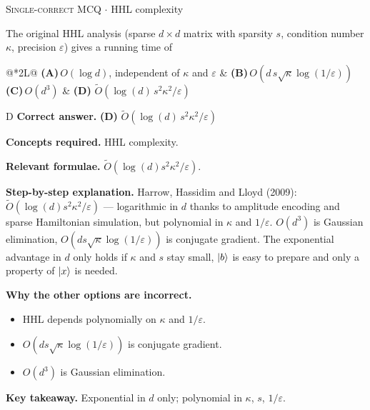 \documentclass[11pt,a4paper]{article}
\newcommand{\optlabel}[1]{\textbf{(#1)}}
\newcommand{\correctlabel}[1]{\textcolor{okgreen}{\textbf{(#1)}\,\ding{51}}}
\newenvironment{qitem}[1]{\begin{list}{}{\setlength{\leftmargin}{3.3em}\setlength{\labelwidth}{3.1em}%
  \setlength{\labelsep}{0.2em}\setlength{\topsep}{3pt}\setlength{\parsep}{3pt}}\item[\textbf{Q.#1}\hfill]}{\end{list}}
\newcommand{\qsep}{\par\vspace{2pt}{\color{black!15}\hrule}\vspace{4pt}}
\newcommand{\qmeta}[2]{{\footnotesize\color{black!60}\textsc{#1} \;$\cdot$\; #2}\par}
\begin{document}
\begin{qitem}{61}
\qmeta{Single-correct MCQ}{HHL complexity}
The original HHL analysis (sparse $d\times d$ matrix with sparsity $s$, condition number $\kappa$, precision $\varepsilon$) gives a running time of
\par\smallskip\noindent\begin{tabularx}{\linewidth}{@{}*{2}{L}@{}}
\optlabel{A}\,$O(\log d)$, independent of $\kappa$ and $\varepsilon$ & \optlabel{B}\,$O(d\,s\sqrt\kappa\log(1/\varepsilon))$ \\[3pt]
\optlabel{C}\,$O(d^3)$ & \correctlabel{D}\,$\tilde O\!\left(\log(d)\,s^2\kappa^2/\varepsilon\right)$
\end{tabularx}
\end{qitem}
\begin{solbox}{D}
\textbf{\color{brand}Correct answer.} \textcolor{okgreen}{\textbf{(D)}} $\tilde O\!\left(\log(d)\,s^2\kappa^2/\varepsilon\right)$

\textbf{\color{brand}Concepts required.} HHL complexity.

\textbf{\color{brand}Relevant formulae.} $\tilde O(\log(d)s^2\kappa^2/\varepsilon)$.

\textbf{\color{brand}Step-by-step explanation.} Harrow, Hassidim and Lloyd (2009): $\tilde O(\log(d)s^2\kappa^2/\varepsilon)$ --- logarithmic in $d$ thanks to amplitude encoding and sparse Hamiltonian simulation, but polynomial in $\kappa$ and
$1/\varepsilon$. $O(d^3)$ is Gaussian elimination, $O(ds\sqrt\kappa\log(1/\varepsilon))$ is conjugate gradient. The exponential advantage in $d$ only holds if $\kappa$ and $s$ stay small,
$\ket b$ is easy to prepare and only a property of $\ket x$ is needed.

\textbf{\color{brand}Why the other options are incorrect.}
\begin{itemize}[leftmargin=2.4em, itemsep=1pt, topsep=2pt]
\item[\textbf{(A)}] HHL depends polynomially on $\kappa$ and $1/\varepsilon$.
\item[\textbf{(B)}] $O(ds\sqrt\kappa\log(1/\varepsilon))$ is conjugate gradient.
\item[\textbf{(C)}] $O(d^3)$ is Gaussian elimination.
\end{itemize}
\textbf{\color{brand}Key takeaway.} Exponential in $d$ only; polynomial in $\kappa$, $s$, $1/\varepsilon$.
\end{solbox}
\qsep
\end{document}
